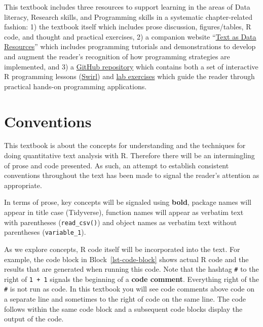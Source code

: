 \documentclass[
  letterpaper,
]{latex/krantz}
\begin{document}

This textbook includes three resources to support learning in the areas
of Data literacy, Research skills, and Programming skills in a
systematic chapter-related fashion: 1) the textbook itself which
includes prose discussion, figures/tables, R code, and thought and
practical exercises, 2) a companion website
``\href{https://lin380.github.io/tadr/}{Text as Data Resources}'' which
includes programming tutorials and demonstrations to develop and augment
the reader's recognition of how programming strategies are implemented,
and 3) a \href{https://github.com/lin380}{GitHub repository} which
contains both a set of interactive R programming lessons
(\href{https://github.com/lin380/swirl}{Swirl}) and
\href{https://github.com/stars/francojc/lists/labs}{lab exercises} which
guide the reader through practical hands-on programming applications.

\hypertarget{conventions}{%
\section*{Conventions}\label{conventions}}


This textbook is about the concepts for understanding and the techniques
for doing quantitative text analysis with R. Therefore there will be an
intermingling of prose and code presented. As such, an attempt to
establish consistent conventions throughout the text has been made to
signal the reader's attention as appropriate.

In terms of prose, key concepts will be signaled using \textbf{bold},
package names will appear in title case (Tidyverse), function names will
appear as verbatim text with parentheses (\texttt{read\_csv()}) and
object names as verbatim text without parentheses
(\texttt{variable\_1}).

As we explore concepts, R code itself will be incorporated into the
text. For example, the code block in Block~\ref{lst-code-block} shows
actual R code and the results that are generated when running this code.
Note that the hashtag \texttt{\#} to the right of \texttt{1\ +\ 1}
signals the beginning of a \textbf{code comment}. Everything right of
the \texttt{\#} is not run as code. In this textbook you will see code
comments above code on a separate line and sometimes to the right of
code on the same line. The code follows within the same code block and a
subsequent code blocks display the output of the code.
\end{document}
